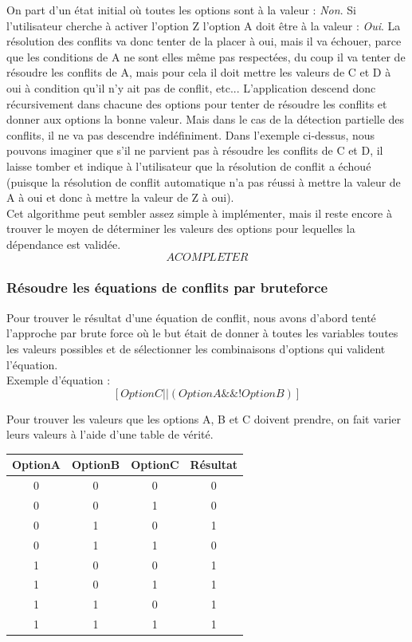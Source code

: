 \documentclass[16pts]{report}
\begin{document}
On part d'un état initial où toutes les options sont à la valeur :
\textit{Non}.  Si l'utilisateur cherche à activer l'option Z l'option A doit
être à la valeur : \textit{Oui}. La résolution des conflits va donc tenter de
la placer à oui, mais il va échouer, parce que les conditions de A ne sont elles
même pas respectées, du coup il va tenter de résoudre les conflits de A, mais
pour cela il doit mettre les valeurs de C et D à oui à condition qu'il n'y ait
pas de conflit, etc...  L'application descend donc récursivement dans chacune
des options pour tenter de résoudre les conflits et donner aux options la bonne
valeur. Mais dans le cas de la détection partielle des conflits, il ne va pas
descendre indéfiniment. Dans l'exemple ci-dessus, nous pouvons imaginer que s'il ne parvient pas à résoudre les conflits de C et D, il laisse tomber et
indique à l'utilisateur que la résolution de conflit a échoué (puisque la
résolution de conflit automatique n'a pas réussi à mettre la valeur de A à oui
et donc à mettre la valeur de Z à oui).\\

Cet algorithme peut sembler assez simple à implémenter, mais il reste encore
à trouver le moyen de déterminer les valeurs des options pour lequelles la
dépendance est validée.\\

\[A COMPLETER\]


            \subsubsection{Résoudre les équations de conflits par bruteforce}
            \label{sub:Résoudre les équations de conflits par bruteforce}

Pour trouver le résultat d'une équation de conflit, nous avons d'abord tenté
l'approche par brute force où le but était de donner à toutes les variables
toutes les valeurs possibles et de sélectionner les combinaisons d'options qui
valident l'équation.  \\

Exemple d'équation :
\[[OptionC || (OptionA \&\& !OptionB)]\]

Pour trouver les valeurs que les options A, B et C doivent prendre, on fait
varier leurs valeurs à l'aide d'une table de vérité.  \\
\begin{tabular}{|c|c|c||c|}
    \hline
    OptionA & OptionB & OptionC & Résultat\\
    \hline
    \hline
    0 & 0 & 0 & 0\\
    \hline
    0 & 0 & 1 & 0\\
    \hline
    0 & 1 & 0 & 1\\
    \hline
    0 & 1 & 1 & 0\\
    \hline
    1 & 0 & 0 & 1\\
    \hline
    1 & 0 & 1 & 1\\
    \hline
    1 & 1 & 0 & 1\\
    \hline
    1 & 1 & 1 & 1\\
    \hline
\end{tabular}
\end{document}
